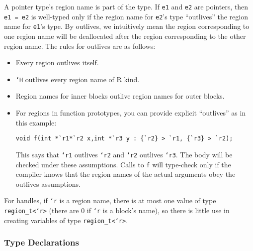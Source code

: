 A pointer type's region name is part of the type.  If \texttt{e1} and
\texttt{e2} are pointers, then \texttt{e1 = e2} is well-typed only if
the region name for \texttt{e2}'s type ``outlives'' the region name
for \texttt{e1}'s type.  By outlives, we intuitively mean the region
corresponding to one region name will be deallocated after the region
corresponding to the other region name.  The rules for outlives are as
follows:
\begin{itemize}
\item Every region outlives itself.
\item \texttt{`H} outlives every region name of R kind.
\item Region names for inner blocks outlive region names for outer
blocks.
\item For regions in function prototypes, you can provide explicit
``outlives'' as in this example:
\begin{verbatim}
void f(int *`r1*`r2 x,int *`r3 y : {`r2} > `r1, {`r3} > `r2);
\end{verbatim}
This says that \texttt{`r1} outlives \texttt{`r2} and \texttt{`r2}
outlives \texttt{`r3}.  The body will be checked under these
assumptions.  Calls to \texttt{f} will type-check only if the compiler
knows that the region names of the actual arguments obey the outlives
assumptions.


\end{itemize}

For handles, if \texttt{`r} is a region name, there is at most one
value of type \texttt{region\_t<`r>} (there are 0 if \texttt{`r} is a
block's name), so there is little use in creating variables of type
\texttt{region\_t<`r>}.

\subsubsection{Type Declarations}

